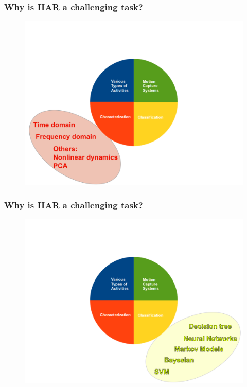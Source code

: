 \documentclass{beamer}
\begin{document}
\begin{frame}
	\frametitle{Why is HAR a challenging task?}
\vspace{-0.5cm}
\begin{figure}
 \includegraphics[scale=.3]{har05}
\vspace{-0.6cm}
\end{figure}
\end{frame}


\begin{frame}
	\frametitle{Why is HAR a challenging task?}
\vspace{-0.5cm}
\begin{figure}
 \includegraphics[scale=.3]{har04}
\vspace{-0.6cm}
\end{figure}
\end{frame}
\end{document}
